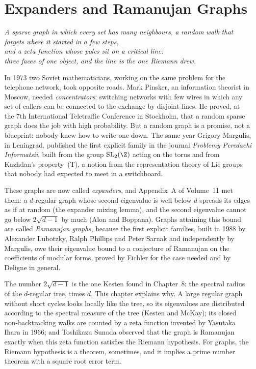 \chapter{Expanders and Ramanujan Graphs}

\begin{center}\itshape
A sparse graph in which every set has many neighbours, a random walk that forgets where it started in a few steps,\\
and a zeta function whose poles sit on a critical line:\\
three faces of one object, and the line is the one Riemann drew.
\end{center}

In 1973 two Soviet mathematicians, working on the same problem for the telephone network, took opposite roads. Mark Pinsker, an information theorist in Moscow, needed \emph{concentrators}: switching networks with few
wires in which any set of callers can be connected to the exchange by disjoint lines. He proved, at the 7th International Teletraffic Conference in Stockholm, that a random sparse graph does the job with
high probability. But a random graph is a promise, not a blueprint: nobody knew how to write one down. The same year Grigory Margulis, in Leningrad, published the first explicit family in the journal
\emph{Problemy Peredachi Informatsii}, built from the group $\mathrm{SL}_2(\Z)$ acting on the torus and from Kazhdan's property~(T), a notion from the representation theory of Lie groups that nobody
had expected to meet in a switchboard.

These graphs are now called \emph{expanders}, and Appendix~A of Volume~11 met them: a $d$-regular graph whose second eigenvalue is well below $d$ spreads its edges as if at random (the expander mixing lemma), and
the second eigenvalue cannot go below $2\sqrt{d-1}$ by much (Alon and Boppana). Graphs attaining this bound are called \emph{Ramanujan graphs}, because the first explicit families, built in 1988 by Alexander
Lubotzky, Ralph Phillips and Peter Sarnak and independently by Margulis, owe their eigenvalue bound to a conjecture of Ramanujan on the coefficients of modular forms, proved by Eichler for the case needed
and by Deligne in general.

The number $2\sqrt{d-1}$ is the one Kesten found in Chapter~8: the spectral radius of the $d$-regular tree, times $d$. This chapter explains why. A large regular graph without short cycles looks locally
like the tree, so its eigenvalues are distributed according to the spectral measure of the tree (Kesten and McKay); its closed non-backtracking walks are counted by a zeta function invented by Yasutaka Ihara
in 1966; and Toshikazu Sunada observed that the graph is Ramanujan exactly when this zeta function satisfies the Riemann hypothesis. For graphs, the Riemann hypothesis is a theorem, sometimes, and it
implies a prime number theorem with a square root error term.

